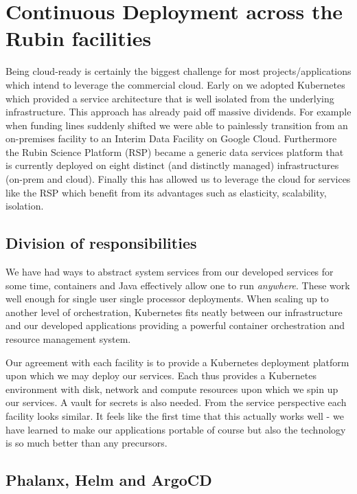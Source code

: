 \section{Continuous Deployment across the Rubin facilities} \label{sec:deploy}

Being cloud-ready is certainly the biggest challenge for most projects/applications which intend to leverage the commercial cloud.
Early on we adopted Kubernetes which provided a service architecture that is well isolated from the underlying infrastructure.
This approach has already paid off massive dividends.
For example when funding lines suddenly shifted we were able to painlessly transition from an on-premises facility to an Interim Data Facility on Google Cloud.
Furthermore the Rubin Science Platform (RSP) became a generic data services platform that is currently deployed on eight distinct (and distinctly managed) infrastructures (on-prem and cloud).
Finally this has allowed us to leverage the cloud for services like the RSP which benefit from its advantages such as elasticity, scalability, isolation.




\subsection{Division of responsibilities}
We have had ways to abstract system services from our developed services for some time, containers and Java effectively allow one to run \emph{anywhere}.
These work well enough for single user single processor deployments.
When scaling up to another level of orchestration, Kubernetes fits neatly between our infrastructure and our developed applications providing a powerful container orchestration and resource management system.

Our agreement with each facility is to provide a Kubernetes deployment platform upon which we may deploy our services.
Each thus provides a Kubernetes environment with disk, network and compute resources upon which we spin up our services.
A vault for secrets is also needed.
From the service perspective each facility looks similar.
It feels like the first time that this actually works well - we have learned to make our applications portable of course but also the technology is so much better than any precursors.

\subsection{Phalanx, Helm and ArgoCD}

